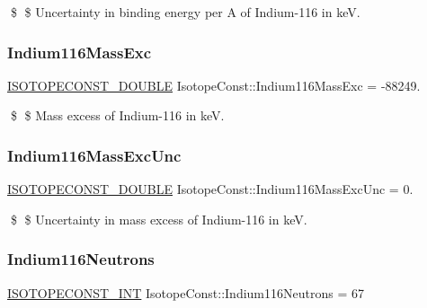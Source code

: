 \$ \$ Uncertainty in binding energy per A of Indium-\/116 in keV. \mbox{\label{group___isotope_const-_indium-_in116_gaab6194b337bff23feae52a0cd75e159a}} 
\subsubsection{\texorpdfstring{Indium116\+Mass\+Exc}{Indium116MassExc}}
{\footnotesize\ttfamily \mbox{\hyperlink{group___isotope_const-_macros_ga8f45a7272ce02c0b4c65c44636ed719a}{I\+S\+O\+T\+O\+P\+E\+C\+O\+N\+S\+T\+\_\+\+D\+O\+U\+B\+LE}} Isotope\+Const\+::\+Indium116\+Mass\+Exc = -\/88249.}

\$ \$ Mass excess of Indium-\/116 in keV. \mbox{\label{group___isotope_const-_indium-_in116_ga3cfe8d49e6b2797c08f126c68b3b6a58}} 
\subsubsection{\texorpdfstring{Indium116\+Mass\+Exc\+Unc}{Indium116MassExcUnc}}
{\footnotesize\ttfamily \mbox{\hyperlink{group___isotope_const-_macros_ga8f45a7272ce02c0b4c65c44636ed719a}{I\+S\+O\+T\+O\+P\+E\+C\+O\+N\+S\+T\+\_\+\+D\+O\+U\+B\+LE}} Isotope\+Const\+::\+Indium116\+Mass\+Exc\+Unc = 0.}

\$ \$ Uncertainty in mass excess of Indium-\/116 in keV. \mbox{\label{group___isotope_const-_indium-_in116_ga320218f6acb0c2052ff45f9ee69c9cc3}} 
\subsubsection{\texorpdfstring{Indium116\+Neutrons}{Indium116Neutrons}}
{\footnotesize\ttfamily \mbox{\hyperlink{group___isotope_const-_macros_ga5f18360b3e99483a35c32d789e62621c}{I\+S\+O\+T\+O\+P\+E\+C\+O\+N\+S\+T\+\_\+\+I\+NT}} Isotope\+Const\+::\+Indium116\+Neutrons = 67}

